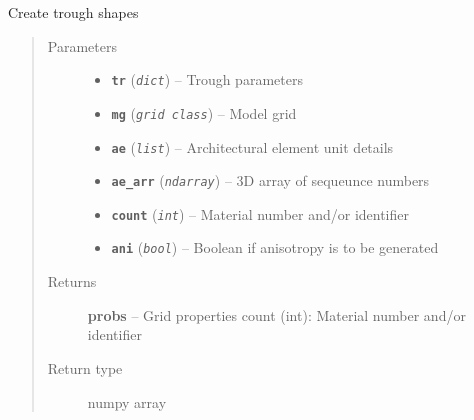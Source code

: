 \documentclass[letterpaper,10pt,english]{sphinxmanual}
\begin{document}
\begin{fulllineitems}
\label{hyvr:hyvr.hyvr.sim.gen_trough}
Create trough shapes
\begin{quote}\begin{description}
\item[{Parameters}] \leavevmode\begin{itemize}
\item {} 
\textbf{\texttt{tr}} (\emph{\texttt{dict}}) -- Trough parameters

\item {} 
\textbf{\texttt{mg}} (\emph{\texttt{grid class}}) -- Model grid

\item {} 
\textbf{\texttt{ae}} (\emph{\texttt{list}}) -- Architectural element unit details

\item {} 
\textbf{\texttt{ae\_arr}} (\emph{\texttt{ndarray}}) -- 3D array of sequeunce numbers

\item {} 
\textbf{\texttt{count}} (\emph{\texttt{int}}) -- Material number and/or identifier

\item {} 
\textbf{\texttt{ani}} (\emph{\texttt{bool}}) -- Boolean if anisotropy is to be generated

\end{itemize}

\item[{Returns}] \leavevmode
\textbf{probs} -- Grid properties
count (int):                    Material number and/or identifier

\item[{Return type}] \leavevmode
numpy array

\end{description}\end{quote}

\end{fulllineitems}

\end{document}
